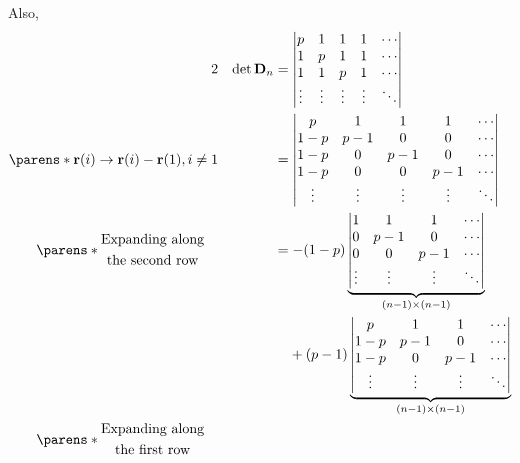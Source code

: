 \documentclass[fleqn,a4paper,11pt]{article}
\begin{document}
\begin{enumerate}[label=\textbf{\arabic*.}]
   Also,
   \begin{alignat*}2
    && \det \mat D_n
    &= \begin{vmatrix}
     p & 1 & 1 & 1 & \cdots \\
     1 & p & 1 & 1 & \cdots \\
     1 & 1 & p & 1 & \cdots \\
     \vdots & \vdots & \vdots & \vdots & \ddots
    \end{vmatrix} \\
    \parens*{
     \vec r(i) \to \vec r(i) - \vec r(1), i \ne 1
    }
    && &= \begin{vmatrix}
     p & 1 & 1 & 1 & \cdots \\
     1 - p & p - 1 & 0 & 0 & \cdots \\
     1 - p & 0 & p - 1 & 0 & \cdots \\
     1 - p & 0 & 0 & p - 1 & \cdots \\
     \vdots & \vdots & \vdots & \vdots & \ddots
    \end{vmatrix} \\
    \parens*{
     \begin{gathered}
      \text{Expanding along} \\
      \text{the second row}
     \end{gathered}} \quad
    && &= -(1 - p)\underbrace{\begin{vmatrix}
     1 & 1 & 1 & \cdots \\
     0 & p - 1 & 0 & \cdots \\
     0 & 0 & p - 1 & \cdots \\
     \vdots & \vdots & \vdots & \ddots \\
    \end{vmatrix}}_{(n - 1) \times (n - 1)} \\
    && &\phantom{={}} + (p - 1)\underbrace{\begin{vmatrix}
     p & 1 & 1 & \cdots \\
     1 - p & p - 1 & 0 & \cdots \\
     1 - p & 0 & p - 1 & \cdots \\
     \vdots & \vdots & \vdots & \ddots
    \end{vmatrix}}_{(n - 1) \times (n - 1)} \\
    \parens*{
     \begin{gathered}
      \text{Expanding along} \\
      \text{the first row}
     \end{gathered}} \quad

\end{alignat*}
\end{enumerate}
\end{document}
